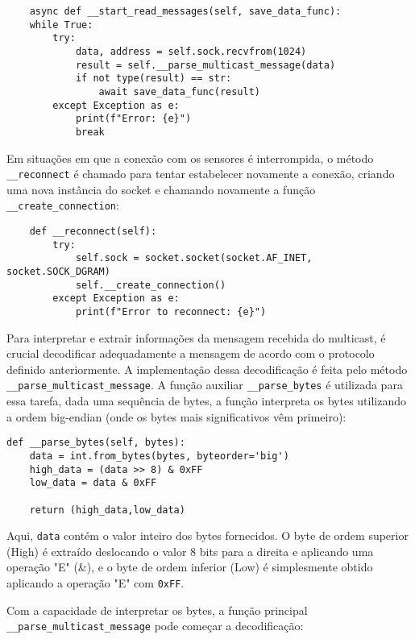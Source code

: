 \begin{verbatim}
    async def __start_read_messages(self, save_data_func):
    while True:
        try:
            data, address = self.sock.recvfrom(1024)
            result = self.__parse_multicast_message(data)
            if not type(result) == str:
                await save_data_func(result)
        except Exception as e:
            print(f"Error: {e}")
            break
\end{verbatim}


Em situações em que a conexão com os sensores é interrompida, o método \texttt{\_\_reconnect} é chamado para tentar estabelecer novamente a conexão, criando uma nova instância do socket e chamando novamente a função \texttt{\_\_create\_connection}:

\begin{verbatim}
    def __reconnect(self):
        try:
            self.sock = socket.socket(socket.AF_INET, socket.SOCK_DGRAM)
            self.__create_connection()
        except Exception as e:
            print(f"Error to reconnect: {e}")
\end{verbatim}
        

Para interpretar e extrair informações da mensagem recebida do multicast, é crucial decodificar adequadamente a mensagem de acordo com o protocolo definido anteriormente. A implementação dessa decodificação é feita pelo método \texttt{\_\_parse\_multicast\_message}. A função auxiliar \texttt{\_\_parse\_bytes} é utilizada para essa tarefa, dada uma sequência de bytes, a função interpreta os bytes utilizando a ordem big-endian (onde os bytes mais significativos vêm primeiro):

\begin{verbatim}
def __parse_bytes(self, bytes):
    data = int.from_bytes(bytes, byteorder='big')
    high_data = (data >> 8) & 0xFF
    low_data = data & 0xFF

    return (high_data,low_data)
\end{verbatim}

Aqui, \texttt{data} contém o valor inteiro dos bytes fornecidos. O byte de ordem superior (High) é extraído deslocando o valor 8 bits para a direita e aplicando uma operação "E" (\&), e o byte de ordem inferior (Low) é simplesmente obtido aplicando a operação "E" com \texttt{0xFF}.

Com a capacidade de interpretar os bytes, a função principal \texttt{\_\_parse\_multicast\_message} pode começar a decodificação:

